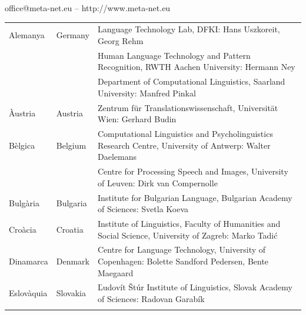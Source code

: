 \vfill
\centerline{office@meta-net.eu -- http://www.meta-net.eu}

\cleardoublepage

\appendix
{}

%

  
\cleardoublepage

\label{metanetmembers}

\small

\begin{longtable}{@{}llp{113mm}@{}}
  Alemanya & \textcolor{grey1}{Germany} & Language Technology Lab, DFKI: Hans Uszkoreit, Georg Rehm\\ \addlinespace
  & & Human Language Technology and Pattern Recognition, RWTH Aachen University: Hermann Ney \\ \addlinespace
  & & Department of Computational Linguistics, Saarland University: Manfred Pinkal\\ \addlinespace
  Àustria & \textcolor{grey1}{Austria} & Zentrum für Translationswissenschaft, Universität Wien: Gerhard Budin\\ \addlinespace 
  Bèlgica & \textcolor{grey1}{Belgium} & Computational Linguistics and Psycholinguistics Research Centre, University of Antwerp: Walter Daelemans\\ \addlinespace
  & & Centre for Processing Speech and Images, University of Leuven: Dirk van Compernolle \\ \addlinespace
  Bulgària & \textcolor{grey1}{Bulgaria} & Institute for Bulgarian Language, Bulgarian Academy of Sciences: Svetla Koeva \\ \addlinespace
  Croàcia & \textcolor{grey1}{Croatia} & Institute of Linguistics, Faculty of Humanities and Social Science, University of Zagreb: Marko Tadić \\ \addlinespace
  Dinamarca &  \textcolor{grey1}{Denmark} & Centre for Language Technology, University of Copenhagen: \newline Bolette Sandford Pedersen, Bente Maegaard\\ \addlinespace
  Eslovàquia & \textcolor{grey1}{Slovakia} & Ľudovít Štúr Institute of Linguistics, Slovak Academy of Sciences: Radovan Garabík \\ \addlinespace 

\end{longtable}
